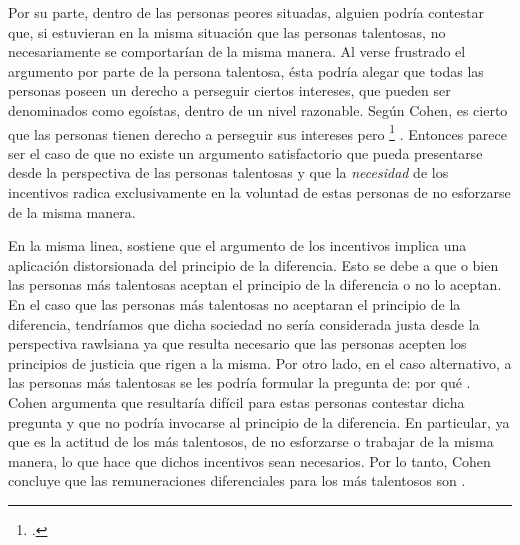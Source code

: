 Por su parte, dentro de las personas peores situadas, alguien podría contestar que, si estuvieran en la misma situación que las personas talentosas, no necesariamente se comportarían de la misma manera. Al verse frustrado el argumento por parte de la persona talentosa, ésta podría alegar que todas las personas poseen un derecho a perseguir ciertos intereses, que pueden ser denominados como egoístas, dentro de un nivel razonable. Según Cohen, es cierto que las personas tienen derecho a perseguir sus intereses pero \footnote{ \citep[p. 61]{Cohen_2008}.} \citep[p. 61]{Cohen_2008}. Entonces parece ser el caso de que no existe un argumento satisfactorio que pueda presentarse desde la perspectiva de las personas talentosas y que la \textit{necesidad} de los incentivos radica exclusivamente en la voluntad de estas personas de no esforzarse de la misma manera.

En la misma linea, \citet{Cohen_2001} sostiene que el argumento de los incentivos implica una aplicación distorsionada del principio de la diferencia. Esto se debe a que o bien las personas más talentosas aceptan el principio de la diferencia o no lo aceptan. En el caso que las personas más talentosas no aceptaran el principio de la diferencia, tendríamos que dicha sociedad no sería considerada justa desde la perspectiva rawlsiana ya que resulta necesario que las personas acepten los principios de justicia que rigen a la misma. Por otro lado, en el caso alternativo, a las personas más talentosas se les podría formular la pregunta de: por qué  \citep[p. 172]{Cohen_2001}. Cohen argumenta que resultaría difícil para estas personas contestar dicha pregunta y que no podría invocarse al principio de la diferencia. En particular, ya que es la actitud de los más talentosos, de no esforzarse o trabajar de la misma manera, lo que hace que dichos incentivos sean necesarios. Por lo tanto, Cohen concluye que las remuneraciones diferenciales para los más talentosos son  \citep[p. 173]{Cohen_2001}.


